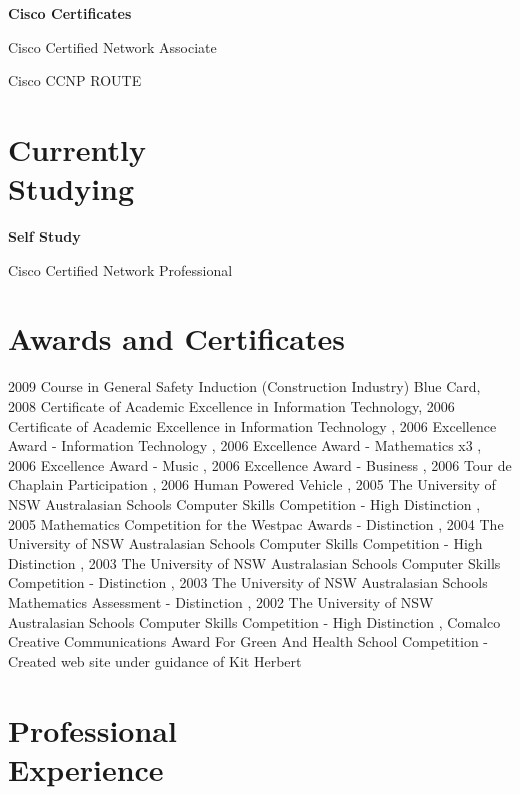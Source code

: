 \documentclass[margin,line]{resume}
\begin{document}
\begin{resume}
    {\bf Cisco Certificates}%
    \begin{list1}
    \vspace*{2mm}
    \item[]  Cisco Certified Network Associate
    \item[]  Cisco CCNP ROUTE
    \end{list1}

     \section{\mysidestyle Currently\\Studying}   
     {\bf Self Study}\vspace{2mm}%
    \begin{list1}
    \item[] Cisco Certified Network Professional
    \end{list1}
    \section{\mysidestyle Awards and Certificates} 

2009 Course in General Safety Induction (Construction Industry) Blue Card, 2008 Certificate of Academic Excellence in Information Technology, 2006 
Certificate of Academic Excellence in Information Technology , 2006 Excellence Award - Information Technology , 2006 Excellence Award - Mathematics 
x3 , 2006 Excellence Award - Music , 2006 Excellence Award - Business , 2006 Tour de Chaplain Participation , 2006 Human Powered Vehicle , 2005 The 
University of NSW Australasian Schools Computer Skills Competition - High Distinction , 2005 Mathematics Competition for the Westpac Awards - 
Distinction , 2004 The University of NSW Australasian Schools Computer Skills Competition - High Distinction , 2003 The University of NSW 
Australasian Schools Computer Skills Competition - Distinction , 2003 The University of NSW Australasian Schools Mathematics Assessment - 
Distinction , 2002 The University of NSW Australasian Schools Computer Skills Competition - High Distinction , Comalco Creative Communications 
Award For Green And Health School Competition - Created web site under guidance of Kit Herbert 


  

    \section{\mysidestyle Professional\\Experience}


\end{resume}
\end{document}
